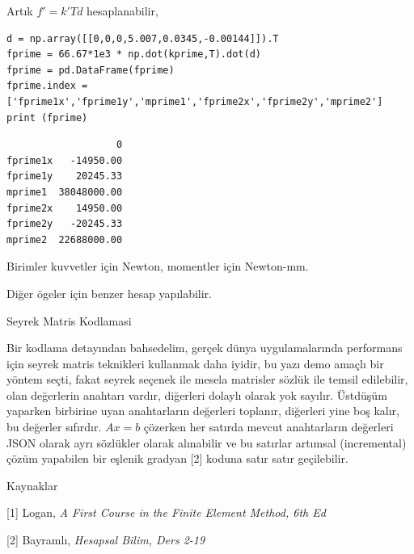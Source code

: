 \documentclass[12pt,fleqn]{article}\usepackage{../../common}
\begin{document}
Artık $f' = k' T d$ hesaplanabilir,

\begin{verbatim}
d = np.array([[0,0,0,5.007,0.0345,-0.00144]]).T
fprime = 66.67*1e3 * np.dot(kprime,T).dot(d)
fprime = pd.DataFrame(fprime)
fprime.index = ['fprime1x','fprime1y','mprime1','fprime2x','fprime2y','mprime2']
print (fprime)
\end{verbatim}

\begin{verbatim}
                   0
fprime1x   -14950.00
fprime1y    20245.33
mprime1  38048000.00
fprime2x    14950.00
fprime2y   -20245.33
mprime2  22688000.00
\end{verbatim}

Birimler kuvvetler için Newton, momentler için Newton-mm.

Diğer ögeler için benzer hesap yapılabilir.

Seyrek Matris Kodlamasi

Bir kodlama detayından bahsedelim, gerçek dünya uygulamalarında performans için
seyrek matris teknikleri kullanmak daha iyidir, bu yazı demo amaçlı bir yöntem
seçti, fakat seyrek seçenek ile mesela matrisler sözlük ile temsil edilebilir,
olan değerlerin anahtarı vardır, diğerleri dolaylı olarak yok sayılır. Üstdüşüm
yaparken birbirine uyan anahtarların değerleri toplanır, diğerleri yine boş
kalır, bu değerler sıfırdır. $Ax=b$ çözerken her satırda mevcut anahtarların
değerleri JSON olarak ayrı sözlükler olarak alınabilir ve bu satırlar artımsal
(incremental) çözüm yapabilen bir eşlenik gradyan [2] koduna satır satır
geçilebilir.

Kaynaklar

[1] Logan, {\em A First Course in the Finite Element Method, 6th Ed}

[2] Bayramlı, {\em Hesapsal Bilim, Ders 2-19}
\end{document}
